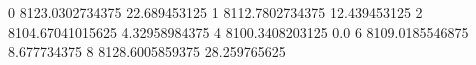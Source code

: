 0 8123.0302734375 22.689453125
1 8112.7802734375 12.439453125
2 8104.67041015625 4.32958984375
4 8100.3408203125 0.0
6 8109.0185546875 8.677734375
8 8128.6005859375 28.259765625
